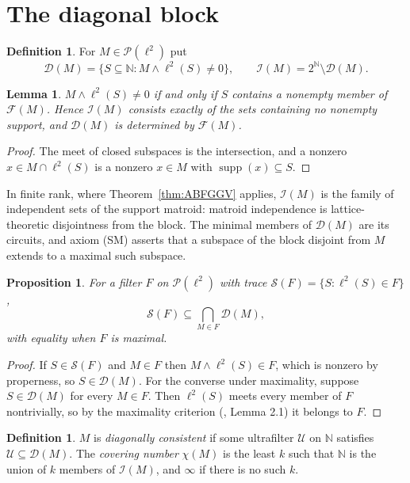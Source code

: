 \documentclass[11pt,reqno]{amsart}
\newtheorem{proposition}[theorem]{Proposition}
\newtheorem{lemma}[theorem]{Lemma}
\theoremstyle{definition}
\newtheorem{definition}[theorem]{Definition}
\DeclareMathOperator{\supp}{supp}
\newcommand{\N}{\mathbb{N}}
\newcommand{\F}{\mathcal{F}}
\newcommand{\cD}{\mathcal{D}}
\newcommand{\cI}{\mathcal{I}}
\newcommand{\cS}{\mathcal{S}}
\newcommand{\cU}{\mathcal{U}}
\newcommand{\PP}{\mathcal{P}}
\begin{document}
\section{The diagonal block}\label{sec:lattice}

\begin{definition}\label{def:DI}
For $M\in\PP(\ell^2)$ put
\[
\cD(M)=\{S\subseteq\N:M\wedge\ell^2(S)\neq0\},\qquad
\cI(M)=2^{\N}\setminus\cD(M).
\]
\end{definition}

\begin{lemma}\label{lem:meetnonzero}
$M\wedge\ell^2(S)\neq0$ if and only if $S$ contains a nonempty member of
$\F(M)$. Hence $\cI(M)$ consists exactly of the sets containing no nonempty
support, and $\cD(M)$ is determined by $\F(M)$.
\end{lemma}

\begin{proof}
The meet of closed subspaces is the intersection, and a nonzero
$x\in M\cap\ell^2(S)$ is a nonzero $x\in M$ with $\supp(x)\subseteq S$.
\end{proof}

In finite rank, where Theorem~\ref{thm:ABFGGV} applies, $\cI(M)$ is the family
of independent sets of the support matroid: matroid independence is
lattice-theoretic disjointness from the block. The minimal members of $\cD(M)$
are its circuits, and axiom (SM) asserts that a subspace of the block disjoint
from $M$ extends to a maximal such subspace.

\begin{proposition}\label{prop:trace}
For a filter $F$ on $\PP(\ell^2)$ with trace
$\cS(F)=\{S:\ell^2(S)\in F\}$,
\[
\cS(F)\subseteq\bigcap_{M\in F}\cD(M),
\]
with equality when $F$ is maximal.
\end{proposition}

\begin{proof}
If $S\in\cS(F)$ and $M\in F$ then $M\wedge\ell^2(S)\in F$, which is nonzero by
properness, so $S\in\cD(M)$. For the converse under maximality, suppose
$S\in\cD(M)$ for every $M\in F$. Then $\ell^2(S)$ meets every member of $F$
nontrivially, so by the maximality criterion (\cite{FWI}, Lemma 2.1) it belongs
to $F$.
\end{proof}

\begin{definition}\label{def:consistent}
$M$ is \emph{diagonally consistent} if some ultrafilter $\cU$ on $\N$ satisfies
$\cU\subseteq\cD(M)$. The \emph{covering number} $\chi(M)$ is the least $k$
such that $\N$ is the union of $k$ members of $\cI(M)$, and $\infty$ if there
is no such $k$.
\end{definition}
\end{document}
